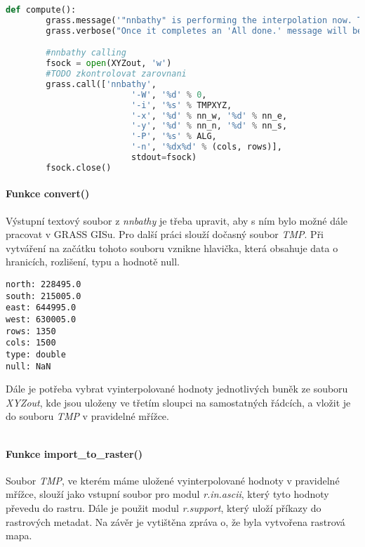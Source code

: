 \documentclass[12pt,a4paper]{article}
\begin{document}
\begin{lstlisting}[language=python, caption={python version}]
def compute():
        grass.message('"nnbathy" is performing the interpolation now. This may take some time...')
        grass.verbose("Once it completes an 'All done.' message will be printed.")

        #nnbathy calling
        fsock = open(XYZout, 'w')
        #TODO zkontrolovat zarovnani
        grass.call(['nnbathy',
                         '-W', '%d' % 0,
                         '-i', '%s' % TMPXYZ,
                         '-x', '%d' % nn_w, '%d' % nn_e,
                         '-y', '%d' % nn_n, '%d' % nn_s,
                         '-P', '%s' % ALG,
                         '-n', '%dx%d' % (cols, rows)],
                         stdout=fsock)
        fsock.close()
\end{lstlisting}

\paragraph{Funkce convert()}
Výstupní textový soubor z \textit{nnbathy} je třeba upravit, aby s ním bylo možné dále pracovat v GRASS GISu. Pro další práci slouží dočasný soubor \textit{TMP}. Při vytváření na začátku tohoto souboru vznikne hlavička, která obsahuje data o hranicích, rozlišení, typu a hodnotě null.

\begin{lstlisting}
north: 228495.0
south: 215005.0
east: 644995.0
west: 630005.0
rows: 1350
cols: 1500
type: double
null: NaN
\end{lstlisting}

Dále je potřeba vybrat vyinterpolované hodnoty jednotlivých buněk ze souboru \textit{XYZout}, kde jsou uloženy ve třetím sloupci na samostatných řádcích, a vložit je do souboru \textit{TMP} v pravidelné mřížce.

\begin{lstlisting}
\end{lstlisting}

\paragraph{Funkce import\_to\_raster()}
Soubor \textit{TMP}, ve kterém máme uložené vyinterpolované hodnoty v pravidelné mřížce, slouží jako vstupní soubor pro modul \textit{r.in.ascii}, který tyto hodnoty převedu do rastru. Dále je použit modul \textit{r.support}, který uloží příkazy do rastrových metadat. Na závěr je vytištěna zpráva o, že byla vytvořena rastrová mapa.
\end{document}
